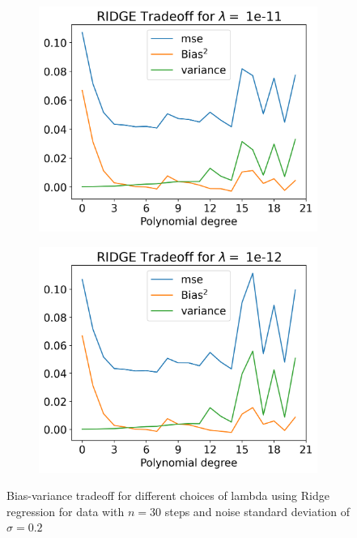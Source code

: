 \documentclass[12pt]{article}
\begin{document}
\begin{figure}[H]
  \begin{subfigure}{.5\textwidth}
    \centering
    \includegraphics[width=\textwidth]{../figures/tradeoff_RIDGE_1e-11_20.png}
    \caption{}
    \label{fig:l_1e-11}
  \end{subfigure}
  \begin{subfigure}{.5\textwidth}
    \centering
    \includegraphics[width=\textwidth]{../figures/tradeoff_RIDGE_1e-12_20.png}
    \caption{}
    \label{fig:l_1e-12}
  \end{subfigure}
  \caption{Bias-variance tradeoff for different choices of lambda using Ridge regression for data with $n=30$ steps and noise standard deviation of $\sigma=0.2$}
  \label{fig:ridge_tradeoff}
\end{figure}
\end{document}
